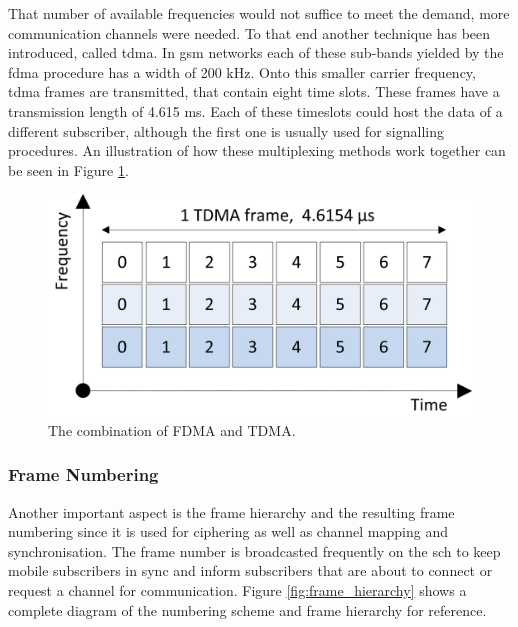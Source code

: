 That number of available frequencies would not suffice to meet the demand, more communication channels were needed.
To that end another technique has been introduced, called \gls{tdma}.
In \gls{gsm} networks each of these sub-bands yielded by the \gls{fdma} procedure has a width of 200 kHz.
Onto this smaller carrier frequency, \gls{tdma} frames are transmitted, that contain eight time slots.
These frames have a transmission length of 4.615 ms.
Each of these timeslots could host the data of a different subscriber, although the first one is usually used for signalling procedures.
An illustration of how these multiplexing methods work together can be seen in Figure \ref{fig:fdma_tdma}.

\begin{figure}
	\centering
	\includegraphics{../Images/TDMAFDMA}
	\caption{The combination of FDMA and TDMA.}
	\label{fig:fdma_tdma}
\end{figure}

\subsubsection{Frame Numbering}
Another important aspect is the frame hierarchy and the resulting frame numbering since it is used for ciphering as well as channel mapping and synchronisation.
The frame number is broadcasted frequently on the \gls{sch} to keep mobile subscribers in sync and inform subscribers that are about to connect or request a channel for communication.
Figure \ref{fig:frame_hierarchy} shows a complete diagram of the numbering scheme and frame hierarchy for reference.

